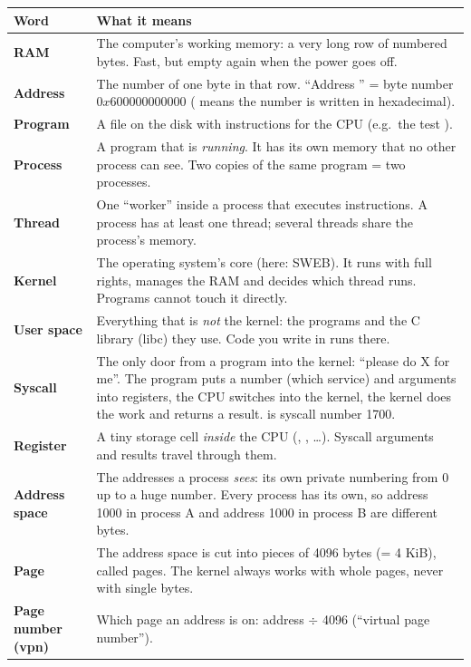 \documentclass[11pt]{report}
\begin{document}
{\small
\begin{longtable}{@{}L{3.1cm} L{12.3cm}@{}}
\toprule
\textbf{Word} & \textbf{What it means}\\\midrule
\endhead
\textbf{RAM} & The computer's working memory: a very long row of numbered bytes. Fast, but empty
  again when the power goes off.\\
\textbf{Address} & The number of one byte in that row. ``Address '' = byte
  number $0x600000000000$ ( means the number is written in hexadecimal).\\
\textbf{Program} & A file on the disk with instructions for the CPU (e.g.\ the test
  ).\\
\textbf{Process} & A program that is \emph{running}. It has its own memory that no other process
  can see. Two copies of the same program = two processes.\\
\textbf{Thread} & One ``worker'' inside a process that executes instructions. A process has at
  least one thread; several threads share the process's memory.\\
\textbf{Kernel} & The operating system's core (here: SWEB). It runs with full rights, manages the RAM
  and decides which thread runs. Programs cannot touch it directly.\\
\textbf{User space} & Everything that is \emph{not} the kernel: the programs and the C library (libc)
  they use. Code you write in  runs there.\\
\textbf{Syscall} & The only door from a program into the kernel: ``please do X for me''. The
  program puts a number (which service) and arguments into registers, the CPU switches into the
  kernel, the kernel does the work and returns a result.  is syscall number 1700.\\
\textbf{Register} & A tiny storage cell \emph{inside} the CPU (, , \ldots). Syscall
  arguments and results travel through them.\\
\textbf{Address space} & The addresses a process \emph{sees}: its own private numbering from 0 up to
  a huge number. Every process has its own, so address 1000 in process A and address 1000 in
  process B are different bytes.\\
\textbf{Page} & The address space is cut into pieces of 4096 bytes (= 4 KiB), called pages.
  The kernel always works with whole pages, never with single bytes.\\
\textbf{Page number (vpn)} & Which page an address is on: address $\div$ 4096 (``virtual page number'').\\

\end{longtable}}
\end{document}
